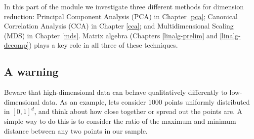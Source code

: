 \documentclass[
]{book}
\theoremstyle{definition}
\theoremstyle{definition}
\theoremstyle{definition}
\theoremstyle{definition}
\theoremstyle{remark}
\begin{document}
In this part of the module we investigate three different methods for dimension reduction: Principal Component Analysis (PCA) in Chapter \ref{pca}; Canonical Correlation Analysis (CCA) in Chapter \ref{cca}; and Multidimensional Scaling (MDS) in Chapter \ref{mds}. Matrix algebra (Chapters \ref{linalg-prelim} and \ref{linalg-decomp}) plays a key role in all three of these techniques.

\hypertarget{a-warning}{%
\subsection*{A warning}\label{a-warning}}

Beware that high-dimensional data can behave qualitatively differently to low-dimensional data. As an example, lets consider 1000 points uniformly distributed in \([0,1]^d\), and think about how close together or spread out the points are. A simple way to do this is to consider the ratio of the maximum and minimum distance between any two points in our sample.
\end{document}
